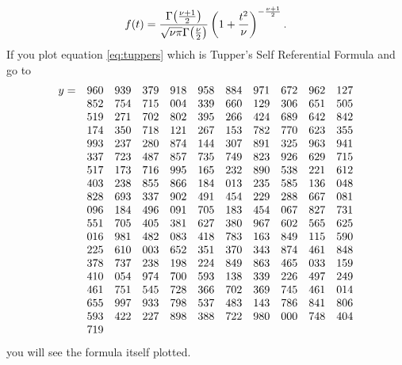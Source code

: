 \documentclass{eeleyes}
\begin{document}
\[
    f(t) = \frac{\Gamma\qty(\frac{\nu + 1}{2})}{\sqrt{\nu \pi} \Gamma\qty(\frac{\nu}{2})} \left( 1 + \frac{t^2}{\nu} \right)^{-\frac{\nu + 1}{2}}
.\]
If you plot equation \ref{eq:tuppers} which is Tupper's Self Referential Formula and go to
\[
    \begin{array}{r c c c c c c c c c c}
       y= & 960 & 939 & 379 & 918 & 958 & 884 & 971 & 672 & 962 & 127 \\
        & 852 & 754 & 715 & 004 & 339 & 660 & 129 & 306 & 651 & 505 \\
        & 519 & 271 & 702 & 802 & 395 & 266 & 424 & 689 & 642 & 842 \\
        & 174 & 350 & 718 & 121 & 267 & 153 & 782 & 770 & 623 & 355 \\
        & 993 & 237 & 280 & 874 & 144 & 307 & 891 & 325 & 963 & 941 \\
        & 337 & 723 & 487 & 857 & 735 & 749 & 823 & 926 & 629 & 715 \\
        & 517 & 173 & 716 & 995 & 165 & 232 & 890 & 538 & 221 & 612 \\
        & 403 & 238 & 855 & 866 & 184 & 013 & 235 & 585 & 136 & 048 \\
        & 828 & 693 & 337 & 902 & 491 & 454 & 229 & 288 & 667 & 081 \\
        & 096 & 184 & 496 & 091 & 705 & 183 & 454 & 067 & 827 & 731 \\
        & 551 & 705 & 405 & 381 & 627 & 380 & 967 & 602 & 565 & 625 \\
        & 016 & 981 & 482 & 083 & 418 & 783 & 163 & 849 & 115 & 590 \\
        & 225 & 610 & 003 & 652 & 351 & 370 & 343 & 874 & 461 & 848 \\
        & 378 & 737 & 238 & 198 & 224 & 849 & 863 & 465 & 033 & 159 \\
        & 410 & 054 & 974 & 700 & 593 & 138 & 339 & 226 & 497 & 249 \\
        & 461 & 751 & 545 & 728 & 366 & 702 & 369 & 745 & 461 & 014 \\
        & 655 & 997 & 933 & 798 & 537 & 483 & 143 & 786 & 841 & 806 \\
        & 593 & 422 & 227 & 898 & 388 & 722 & 980 & 000 & 748 & 404 \\
        & 719 & & & & & & & & &
    \end{array}
\]
you will see the formula itself plotted.
\end{document}
